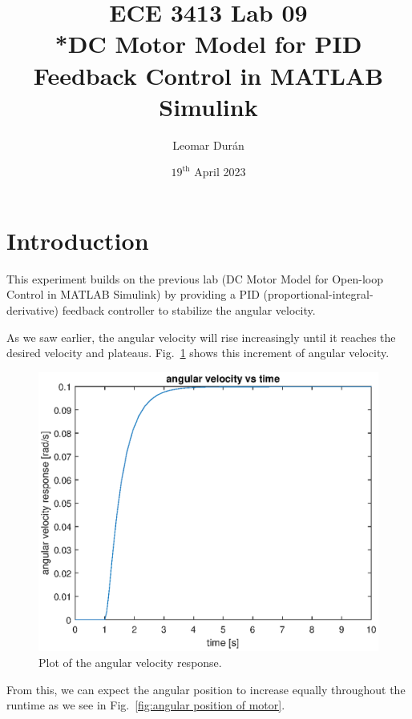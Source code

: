 \documentclass[12pt]{article}
\title{ECE 3413 Lab 09\\*DC Motor Model for PID Feedback Control in MATLAB Simulink}
\author{Leomar Dur\'an}
\date{${19}^{\text{th}}$ April 2023}
\begin{document}
\maketitle
\newpage

\section{Introduction}

This experiment builds on the previous lab (DC Motor Model for Open-loop Control in MATLAB Simulink) by providing a PID (proportional-integral-derivative) feedback controller to stabilize the angular velocity.

As we saw earlier, the angular velocity will rise increasingly until it reaches the desired velocity and plateaus. Fig.~\ref{fig:plot of angular velocity} shows this increment of angular velocity.

\begin{figure}
    \centering
    \includegraphics[width=\linewidth]{img/task02_plot_angular_velocity.eps}
    \caption{Plot of the angular velocity response.}
    \label{fig:plot of angular velocity}
\end{figure}

From this, we can expect the angular position to increase equally throughout the runtime as we see in Fig.~\ref{fig:angular position of motor}.
\end{document}
